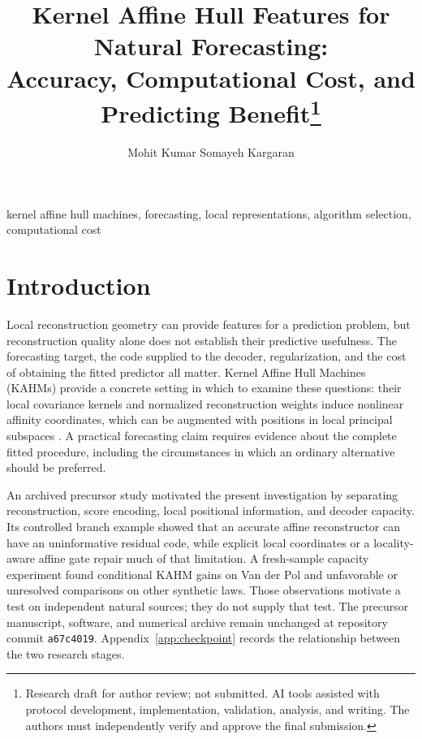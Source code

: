 \documentclass[twoside,11pt]{article}
\begin{document}
\title{Kernel Affine Hull Features for Natural Forecasting:\\
Accuracy, Computational Cost, and Predicting Benefit\thanks{Research draft for author review; not submitted. AI tools assisted with protocol development, implementation, validation, analysis, and writing. The authors must independently verify and approve the final submission.}}
\author{\name Mohit Kumar \AND \name Somayeh Kargaran}
\maketitle
\begin{abstract}%

\end{abstract}
\begin{keywords}
kernel affine hull machines, forecasting, local representations, algorithm selection, computational cost
\end{keywords}

\section{Introduction}\label{sec:introduction}
Local reconstruction geometry can provide features for a prediction problem,
but reconstruction quality alone does not establish their predictive usefulness.
The forecasting target, the code supplied to the decoder, regularization, and
the cost of obtaining the fitted predictor all matter. Kernel Affine Hull
Machines (KAHMs) provide a concrete setting in which to examine these questions:
their local covariance kernels and normalized reconstruction weights induce
nonlinear affinity coordinates, which can be augmented with positions in local
principal subspaces \citep{Kumar2024KAHM}. A practical forecasting claim requires
evidence about the complete fitted procedure, including the circumstances in
which an ordinary alternative should be preferred.

An archived precursor study motivated the present investigation by separating
reconstruction, score encoding, local positional information, and decoder
capacity. Its controlled branch example showed that an accurate affine
reconstructor can have an uninformative residual code, while explicit local
coordinates or a locality-aware affine gate repair much of that limitation.
A fresh-sample capacity experiment found conditional KAHM gains on Van der Pol
and unfavorable or unresolved comparisons on other synthetic laws. Those
observations motivate a test on independent natural sources; they do not supply
that test. The precursor manuscript, software, and numerical archive remain
unchanged at repository commit \texttt{a67c4019}. Appendix~\ref{app:checkpoint}
records the relationship between the two research stages.
\end{document}
